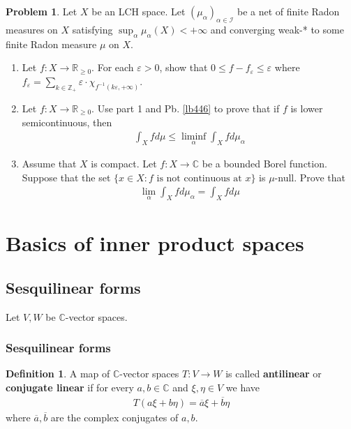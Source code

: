 \documentclass[12pt,b5paper,notitlepage]{article}
\theoremstyle{definition}
\newtheorem{df}{Definition}[subsection]
\newtheorem{prob}{\color{red}Problem}[section]
\theoremstyle{plain}
\newcommand{\ovl}{\overline}
\newcommand{\Cbb}{\mathbb C}
\newcommand{\Zbb}{\mathbb Z}
\newcommand{\Rbb}{\mathbb R}
\newcommand{\eps}{\varepsilon}
\newcommand{\SI}{\mathscr I}
\numberwithin{equation}{section}
\begin{document}
\begin{prob}\label{lb447}
Let $X$ be an LCH space. Let $(\mu_\alpha)_{\alpha\in\SI}$ be a net of finite Radon measures on $X$ satisfying $\sup_\alpha \mu_\alpha(X)<+\infty$ and converging weak-* to some finite Radon measure $\mu$ on $X$.
\begin{enumerate}
\item Let $f:X\rightarrow\Rbb_{\geq0}$. For each $\eps>0$, show that $0\leq f-f_\eps\leq \eps$ where $f_\eps=\sum_{k\in\Zbb_+}\eps\cdot\chi_{f^{-1}(k\eps,+\infty)}$.
\item Let $f:X\rightarrow\Rbb_{\geq0}$. Use part 1 and Pb. \ref{lb446} to prove that if $f$ is lower semicontinuous, then
\begin{align*}
\int_Xfd\mu\leq\liminf_\alpha\int_Xfd\mu_\alpha
\end{align*}
\item Assume that $X$ is compact. Let $f:X\rightarrow\Cbb$ be a bounded Borel function. Suppose that the set $\{x\in X:f\text{ is not continuous at }x\}$ is $\mu$-null. Prove that
\begin{align*}
\lim_\alpha\int_X fd\mu_\alpha=\int_Xfd\mu
\end{align*}
\end{enumerate}
\end{prob}






\newpage








\section{Basics of inner product spaces}




\subsection{Sesquilinear forms}



Let $V,W$ be $\Cbb$-vector spaces.



\subsubsection{Sesquilinear forms}



\begin{df}
A map of $\Cbb$-vector spaces $T:V\rightarrow W$ is called \textbf{antilinear} or \textbf{conjugate linear}  if for every $a,b\in\Cbb$ and $\xi,\eta\in V$ we have
\begin{align*}
T(a\xi+b\eta)=\ovl a\xi+\ovl b\eta
\end{align*}
where $\ovl a,\ovl b$ are the complex conjugates of $a,b$.
\end{df}
\end{document}
